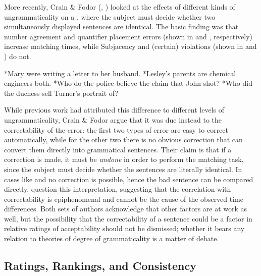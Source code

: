 More recently, Crain \& Fodor (\citeyear{CrainFodor1985}, \citeyear{CrainEtAl1987}) looked at the effects of different kinds of ungrammaticality on a , where the subject
must decide whether two simultaneously displayed sentences are identical. The basic finding was that number agreement and quantifier placement errors (shown in  and , respectively) increase matching times, while Subjacency and (certain)  violations (shown in  and ) do not.

\ea \label{ex:3:9}
*Mary were writing a letter to her husband.
\z
\ea\label{ex:3:10}
 *Lesley's parents are chemical engineers both.
\z
\ea\label{ex:3:11}
 *Who do the police believe the claim that John shot?
\z
\ea\label{ex:3:12}
 *Who did the duchess sell Turner's portrait of?
\z


While previous work had attributed this difference to different levels of ungrammaticality, Crain \& Fodor argue that it was due instead to the correctability of the error: the first two types of error are easy to correct automatically, while for the other two there is no obvious correction that can convert them directly into grammatical sentences. Their claim is that if a correction is made, it must be \textit{undone} in order to perform the matching task, since the subject must decide whether the sentences are literally identical. In cases like  and  no correction is possible, hence the bad sentence can be compared directly. \citet{ForsterEtAl1987} question this interpretation, suggesting that the correlation with correctability is epiphenomenal and cannot be the cause of the observed time differences. Both sets of authors acknowledge that other factors are at work as well, but the possibility that the correctability of a sentence could be a factor in relative ratings of acceptability should not be dismissed; whether it bears any relation to theories of degree of grammaticality is a matter of debate.

\subsection{Ratings, Rankings, and Consistency} \label{sec:3.3.4}


